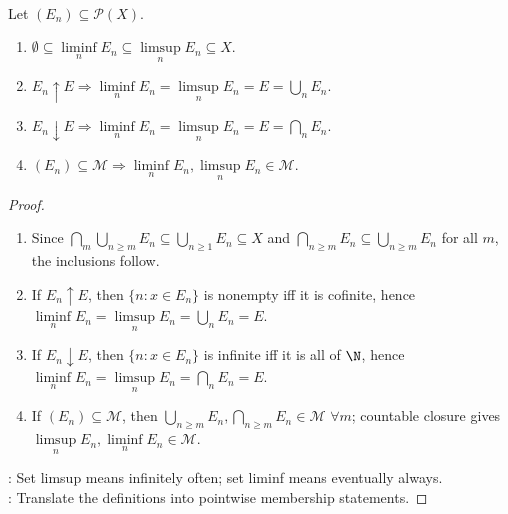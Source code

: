 \begin{proposition} \label{prop:set-limits-basic-laws} \\
Let $(E_n)\subseteq\mathcal{P}(X)$.
\begin{enumerate}[label=(\roman*)]
\setlength{\itemsep}{0pt}
\item $\emptyset\subseteq\liminf\limits_nE_n\subseteq\limsup\limits_nE_n\subseteq X$.
\item $E_n\uparrow E\Longrightarrow\liminf\limits_nE_n=\limsup\limits_nE_n=E=\bigcup\limits_nE_n$.
\item $E_n\downarrow E\Longrightarrow\liminf\limits_nE_n=\limsup\limits_nE_n=E=\bigcap\limits_nE_n$.
\item $(E_n)\subseteq\mathcal{M}\Longrightarrow\liminf\limits_nE_n,\limsup\limits_nE_n\in\mathcal{M}$.
\end{enumerate}
\begin{proof}
\begin{enumerate}[label=(\roman*)]
\setlength{\itemsep}{0pt}
\item Since $\bigcap\limits_m\bigcup\limits_{n\geq m}E_n\subseteq\bigcup\limits_{n\geq1}E_n\subseteq X$ and $\bigcap\limits_{n\geq m}E_n\subseteq\bigcup\limits_{n\geq m}E_n$ for all $m$, the inclusions follow.
\item If $E_n\uparrow E$, then $\{n:x\in E_n\}$ is nonempty iff it is cofinite, hence $\liminf\limits_nE_n=\limsup\limits_nE_n=\bigcup\limits_nE_n=E$.
\item If $E_n\downarrow E$, then $\{n:x\in E_n\}$ is infinite iff it is all of $\N$, hence $\liminf\limits_nE_n=\limsup\limits_nE_n=\bigcap\limits_nE_n=E$.
\item If $(E_n)\subseteq\mathcal{M}$, then $\bigcup\limits_{n\geq m}E_n,\bigcap\limits_{n\geq m}E_n\in\mathcal{M}$ $\forall m$; countable closure gives $\limsup\limits_nE_n,\liminf\limits_nE_n\in\mathcal{M}$.
\end{enumerate}
: Set limsup means infinitely often; set liminf means eventually always.\\
: Translate the definitions into pointwise membership statements.
\end{proof}
\end{proposition}

